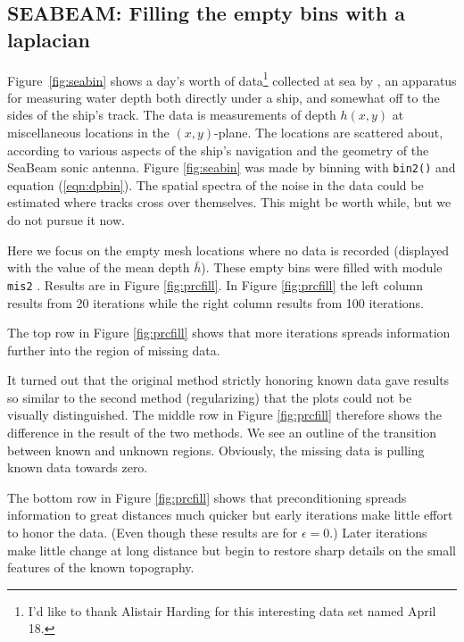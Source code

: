 \subsection{SEABEAM: Filling the empty bins with a laplacian}

Figure~\ref{fig:seabin} shows a day's worth of data\footnote{
        I'd like to thank Alistair Harding
        for this interesting data set
        named April 18.
        }
collected at sea by ,
an apparatus for measuring water depth both
directly under a ship, and somewhat off to the sides of the ship's track.
The data is measurements of depth $h(x,y)$ at miscellaneous locations
in the $(x,y)$-plane.
The locations are scattered about,
according to various aspects
of the ship's navigation and the geometry of the SeaBeam sonic antenna.
Figure \ref{fig:seabin} was made by binning with
\texttt{bin2()} 
and equation (\ref{eqn:dpbin}).
The spatial spectra of the noise in the data
could be estimated where tracks cross over themselves.
This might be worth while, but we do not pursue it now.


\par
Here we focus on the empty mesh locations where no data is recorded
(displayed with the value of the mean depth $\bar h$).
These empty bins were filled with
module \texttt{mis2} .
Results are in Figure \ref{fig:prcfill}.
In Figure \ref{fig:prcfill} the left column results from 20 iterations
while the right column results from 100 iterations.
\par
The top row in Figure \ref{fig:prcfill} shows that more iterations
spreads information further into the region of missing data.
\par
It turned out that the original method strictly honoring known data
gave results so similar to the second method (regularizing)
that the plots could not be visually distinguished.
The middle row in Figure \ref{fig:prcfill} therefore shows
the difference in the result of the two methods.
We see an outline of the transition between known and unknown regions.
Obviously, the missing data is pulling known data towards zero.

\par
The bottom row in Figure \ref{fig:prcfill} shows that preconditioning
spreads information to great distances much quicker
but early iterations make little effort to honor the data.
(Even though these results are for $\epsilon=0$.)
Later iterations make little change at long distance
but begin to restore sharp details on the small features
of the known topography.

